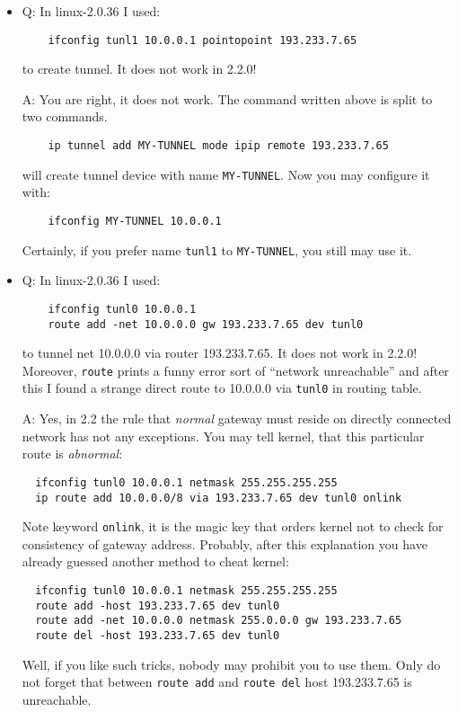 \begin{itemize}

\item
Q: In linux-2.0.36 I used:
\begin{verbatim} 
    ifconfig tunl1 10.0.0.1 pointopoint 193.233.7.65
\end{verbatim} 
to create tunnel. It does not work in 2.2.0!

A: You are right, it does not work. The command written above is split to two commands.
\begin{verbatim}
    ip tunnel add MY-TUNNEL mode ipip remote 193.233.7.65
\end{verbatim} 
will create tunnel device with name \verb|MY-TUNNEL|. Now you may configure
it with:
\begin{verbatim} 
    ifconfig MY-TUNNEL 10.0.0.1
\end{verbatim} 
Certainly, if you prefer name \verb|tunl1| to \verb|MY-TUNNEL|,
you still may use it.

\item
Q: In linux-2.0.36 I used:
\begin{verbatim} 
    ifconfig tunl0 10.0.0.1
    route add -net 10.0.0.0 gw 193.233.7.65 dev tunl0
\end{verbatim} 
to tunnel net 10.0.0.0 via router 193.233.7.65. It does not
work in 2.2.0! Moreover, \verb|route| prints a funny error sort of
``network unreachable'' and after this I found a strange direct route
to 10.0.0.0 via \verb|tunl0| in routing table.

A: Yes, in 2.2 the rule that {\em normal} gateway must reside on directly
connected network has not any exceptions. You may tell kernel, that
this particular route is {\em abnormal}:
\begin{verbatim} 
  ifconfig tunl0 10.0.0.1 netmask 255.255.255.255
  ip route add 10.0.0.0/8 via 193.233.7.65 dev tunl0 onlink
\end{verbatim}
Note keyword \verb|onlink|, it is the magic key that orders kernel
not to check for consistency of gateway address.
Probably, after this explanation you have already guessed another method
to cheat kernel:
\begin{verbatim} 
  ifconfig tunl0 10.0.0.1 netmask 255.255.255.255
  route add -host 193.233.7.65 dev tunl0
  route add -net 10.0.0.0 netmask 255.0.0.0 gw 193.233.7.65
  route del -host 193.233.7.65 dev tunl0
\end{verbatim}
Well, if you like such tricks, nobody may prohibit you to use them.
Only do not forget
that between \verb|route add| and \verb|route del| host 193.233.7.65 is
unreachable.


\end{itemize}
